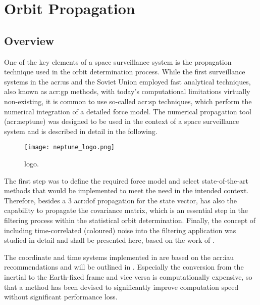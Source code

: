 \chapter{Orbit Propagation}
\label{cha:OrbitPropagation}

\section{Overview}

One of the key elements of a space surveillance system is the propagation technique used in the orbit determination process. While the first surveillance systems in the \acrshort{acr:us} and the Soviet Union 
employed fast analytical techniques, also known as \gls{acr:gp} methods, with today's computational limitations virtually non-existing, it is common to use so-called \gls{acr:sp} techniques, 
which perform the numerical integration of a detailed force model. The numerical propagation tool \neptune (\acrlong{acr:neptune}) was designed to be used in the context of a space surveillance system and is described in detail in the following. 
\begin{figure}[h!]
 \centering
 \texttt{[image: neptune\_logo.png]}
 \caption{\neptune logo.\label{fig:neptune-logo}}
\end{figure}
The first step was to define the required force model and select state-of-the-art methods that would be implemented to meet the need in the intended context. Therefore, besides a 3 \gls{acr:dof} propagation for the state vector, \neptune has also 
the capability to propagate the covariance matrix, which is an essential step in the filtering process within the statistical orbit determination. Finally, the concept of 
including time-correlated (coloured) noise into the filtering application was studied in detail and shall be presented here, based on the work of 
\citet{nazarenko2010}.

The coordinate and time systems implemented in \neptune are based on the \gls{acr:iau} recommendations and will be outlined in . Especially the 
conversion from the inertial to the Earth-fixed frame and vice versa is computationally expensive, so that a method has been devised to significantly improve 
computation speed without significant performance loss.

